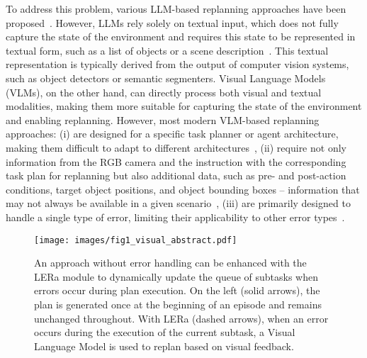 \documentclass[letterpaper, 10 pt, conference]{ieeeconf}  %
\begin{document}
To address this problem, various LLM-based replanning approaches have been proposed~\cite{song2023llm,guo2024doremi,joublin2024copal}. However, LLMs rely solely on textual input, which does not fully capture the state of the environment and requires this state to be represented in textual form, such as a list of objects or a scene description~\cite{huang2022language,10161317,10160591,10801328,song2023llm}. This textual representation is typically derived from the output of computer vision systems, such as object detectors or semantic segmenters. Visual Language Models (VLMs), on the other hand, can directly process both visual and textual modalities, making them more suitable for capturing the state of the environment and enabling replanning. However, most modern VLM-based replanning approaches: (i) are designed for a specific task planner or agent architecture, making them difficult to adapt to different architectures~\cite{zhang2023grounding,yang2024guidinglonghorizontaskmotion,mei2024replanvlm,skreta2024replan}, (ii) require not only information from the RGB camera and the instruction with the corresponding task plan for replanning but also additional data, such as pre- and post-action conditions, target object positions, and object bounding boxes -- information that may not always be available in a given scenario~\cite{yang2024guidinglonghorizontaskmotion,mei2024replanvlm}, (iii) are primarily designed to handle a single type of error, limiting their applicability to other error types~\cite{zhang2023grounding,yang2024guidinglonghorizontaskmotion,skreta2024replan}.
\begin{figure}
    \centering
 \texttt{[image: images/fig1\_visual\_abstract.pdf]}
    \caption{
    An approach without error handling can be enhanced with the LERa module to dynamically update the queue of subtasks when errors occur during plan execution. On the left (solid arrows), the plan is generated once at the beginning of an episode and remains unchanged throughout. With LERa (dashed arrows), when an error occurs during the execution of the current subtask, a Visual Language Model is used to replan based on visual feedback.
    }
    \label{fig:visab}
    \vspace{-10pt}
\end{figure}
\end{document}
